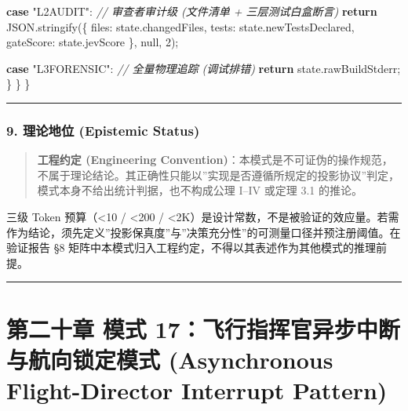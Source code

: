 \documentclass[
]{ctexart}
\newenvironment{Shaded}{}{}
\newcommand{\AttributeTok}[1]{\textcolor[rgb]{0.49,0.56,0.16}{#1}}
\newcommand{\BuiltInTok}[1]{\textcolor[rgb]{0.00,0.50,0.00}{#1}}
\newcommand{\CommentTok}[1]{\textcolor[rgb]{0.38,0.63,0.69}{\textit{#1}}}
\newcommand{\ControlFlowTok}[1]{\textcolor[rgb]{0.00,0.44,0.13}{\textbf{#1}}}
\newcommand{\DataTypeTok}[1]{\textcolor[rgb]{0.56,0.13,0.00}{#1}}
\newcommand{\DecValTok}[1]{\textcolor[rgb]{0.25,0.63,0.44}{#1}}
\newcommand{\FunctionTok}[1]{\textcolor[rgb]{0.02,0.16,0.49}{#1}}
\newcommand{\NormalTok}[1]{#1}
\newcommand{\OperatorTok}[1]{\textcolor[rgb]{0.40,0.40,0.40}{#1}}
\newcommand{\StringTok}[1]{\textcolor[rgb]{0.25,0.44,0.63}{#1}}
\renewcommand{\_}{\discretionary{}{}{\textunderscore}}
\let\oldsection\section
\renewcommand{\section}{\clearpage\oldsection}
\begin{document}
\begin{Shaded}
\begin{Highlighting}[]
      \ControlFlowTok{case} \StringTok{"L2\_AUDIT"}\OperatorTok{:}
        \CommentTok{// 审查者审计级 (文件清单 + 三层测试白盒断言)}
        \ControlFlowTok{return} \BuiltInTok{JSON}\OperatorTok{.}\FunctionTok{stringify}\NormalTok{(\{}
\NormalTok{          files}\OperatorTok{:}\NormalTok{ state}\OperatorTok{.}\AttributeTok{changedFiles}\OperatorTok{,}
\NormalTok{          tests}\OperatorTok{:}\NormalTok{ state}\OperatorTok{.}\AttributeTok{newTestsDeclared}\OperatorTok{,}
\NormalTok{          gateScore}\OperatorTok{:}\NormalTok{ state}\OperatorTok{.}\AttributeTok{jevScore}
\NormalTok{        \}}\OperatorTok{,} \DataTypeTok{null}\OperatorTok{,} \DecValTok{2}\NormalTok{)}\OperatorTok{;}

      \ControlFlowTok{case} \StringTok{"L3\_FORENSIC"}\OperatorTok{:}
        \CommentTok{// 全量物理追踪 (调试排错)}
        \ControlFlowTok{return}\NormalTok{ state}\OperatorTok{.}\AttributeTok{rawBuildStderr}\OperatorTok{;}
\NormalTok{    \}}
\NormalTok{  \}}
\NormalTok{\}}
\end{Highlighting}
\end{Shaded}

\begin{center}\rule{0.5\linewidth}{0.5pt}\end{center}

\subsubsection{9. 理论地位 (Epistemic
Status)}\label{ux7406ux8bbaux5730ux4f4d-epistemic-status-1}

\begin{quote}
\textbf{工程约定 (Engineering
Convention)}：本模式是不可证伪的操作规范，不属于理论结论。其正确性只能以''实现是否遵循所规定的投影协议''判定，模式本身不给出统计判据，也不构成公理
I--IV 或定理 3.1 的推论。
\end{quote}

三级 Token 预算（\textless10 / \textless200 /
\textless2K）是设计常数，不是被验证的效应量。若需作为结论，须先定义''投影保真度''与''决策充分性''的可测量口径并预注册阈值。在验证报告
§8 矩阵中本模式归入工程约定，不得以其表述作为其他模式的推理前提。

\begin{center}\rule{0.5\linewidth}{0.5pt}\end{center}

\section{第二十章 模式 17：飞行指挥官异步中断与航向锁定模式 (Asynchronous
Flight-Director Interrupt
Pattern)}\label{ux6a21ux5f0f-17ux98deux884cux6307ux6325ux5b98ux5f02ux6b65ux4e2dux65adux4e0eux822aux5411ux9501ux5b9aux6a21ux5f0f-asynchronous-flight-director-interrupt-pattern}
\end{document}
